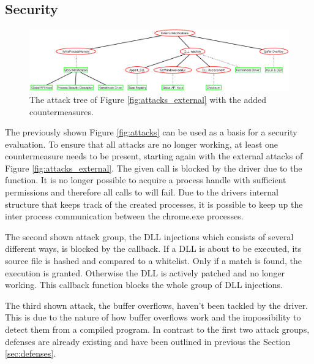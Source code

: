 \subsection{Security}
\begin{figure}[h]
\centering
\includegraphics[angle=90,scale=0.3]{sections/adtrees/ExternalModifications.png}
\caption{The attack tree of Figure \ref{fig:attacks_external} with the added countermeasures.}
\label{fig:attacks_external_def}
\end{figure}
The previously shown Figure \ref{fig:attacks} can be used as a basis for a security evaluation. To ensure that all attacks are no longer working, at least one countermeasure needs to be present, starting again with the external attacks of Figure \ref{fig:attacks_external}. The given  call is blocked by the driver due to the  function. It is no longer possible to acquire a process handle with sufficient permissions and therefore all calls to  will fail. Due to the drivers internal structure that keeps track of the created processes, it is possible to keep up the inter process communication between the chrome.exe processes. 

The second shown attack group, the DLL injections which consists of several different ways, is blocked by the  callback. If a DLL is about to be executed, its source file is hashed and compared to a whitelist. Only if a match is found, the execution is granted. Otherwise the DLL is actively patched and no longer working. This callback function blocks the whole group of DLL injections.

The third shown attack, the buffer overflows, haven't been tackled by the driver. This is due to the nature of how buffer overflows work and the impossibility to detect them from a compiled program. In contrast to the first two attack groups, defenses are already existing and have been outlined in previous the Section \ref{sec:defenses}.

